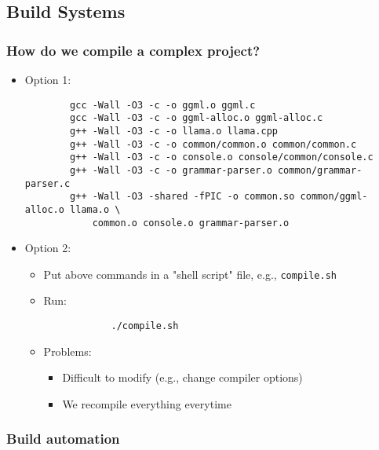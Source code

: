 \documentclass[12pt]{article}
\begin{document}
\subsection{Build Systems}

\subsubsection{How do we compile a complex project?}

\begin{itemize}
    \item Option 1:
    \begin{lstlisting}
        gcc -Wall -O3 -c -o ggml.o ggml.c
        gcc -Wall -O3 -c -o ggml-alloc.o ggml-alloc.c
        g++ -Wall -O3 -c -o llama.o llama.cpp
        g++ -Wall -O3 -c -o common/common.o common/common.c
        g++ -Wall -O3 -c -o console.o console/common/console.c
        g++ -Wall -O3 -c -o grammar-parser.o common/grammar-parser.c
        g++ -Wall -O3 -shared -fPIC -o common.so common/ggml-alloc.o llama.o \
            common.o console.o grammar-parser.o
    \end{lstlisting}
    
    \item Option 2:
    \begin{itemize}
        \item Put above commands in a "shell script" file, e.g., \texttt{compile.sh}
        
        \item Run:
        \begin{lstlisting}
            ./compile.sh
        \end{lstlisting}
        
        \item Problems:
        \begin{itemize}
            \item Difficult to modify (e.g., change compiler options)
            \item We recompile everything everytime
        \end{itemize}
    \end{itemize}
\end{itemize}

\subsubsection{Build automation}
\end{document}
